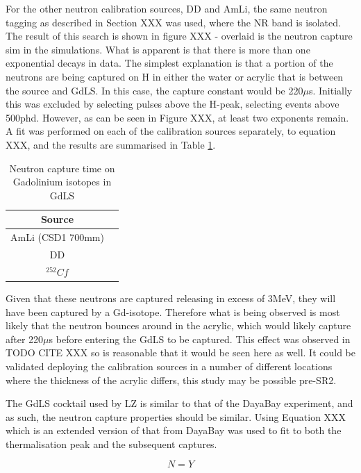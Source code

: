 \par
For the other neutron calibration sources, DD and AmLi, the same neutron tagging as described in Section XXX was used, where the NR band is isolated.
The result of this search is shown in figure XXX - overlaid is the neutron capture sim in the simulations.
What is apparent is that there is more than one exponential decays in data.
The simplest explanation is that a portion of the neutrons are being captured on H in either the water or acrylic that is between the source and GdLS.
In this case, the capture constant would be 220$\mu$s.
Initially this was excluded by selecting pulses above the H-peak, selecting events above 500phd.
However, as can be seen in Figure XXX, at least two exponents remain.
A fit was performed on each of the calibration sources separately, to equation XXX, and the results are summarised in Table \ref{tab:neutron_capture_times}.
\begin{table}[!htbp]
    \centering
    \begin{tabular}{c|c}
        Source            &  \\ \hline
        AmLi (CSD1 700mm) & \\ 
        DD                & \\
        ${}^{252}{Cf}$    &
    \end{tabular}
    \caption{Neutron capture time on Gadolinium isotopes in GdLS}
    \label{tab:neutron_capture_times}
\end{table}

Given that these neutrons are captured releasing in excess of 3MeV, they will have been captured by a Gd-isotope. 
Therefore what is being observed is most likely that the neutron bounces around in the acrylic, which would likely capture after 220$\mu$s before entering the GdLS to be captured.
This effect was observed in TODO CITE XXX so is reasonable that it would be seen here as well.
It could be validated deploying the calibration sources in a number of different locations where the thickness of the acrylic differs, this study may be possible pre-SR2.


\par
The GdLS cocktail used by LZ is similar to that of the DayaBay experiment, and as such, the neutron capture properties should be similar.
Using Equation XXX which is an extended version of that from DayaBay \cite{Dayabay_neutron_capture_fit_ref} was used to fit to both the thermalisation peak and the subsequent captures.

\begin{equation}
    N = Y
\end{equation}